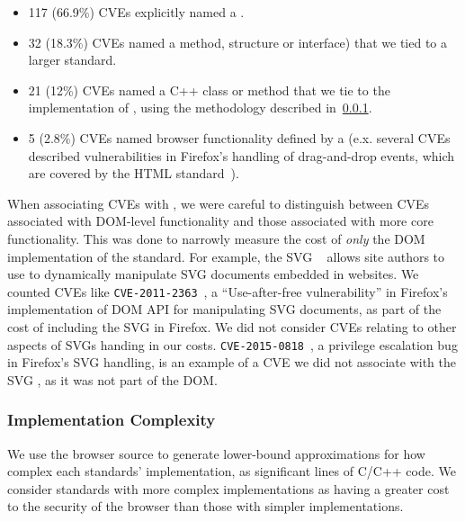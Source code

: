 \hspace{1em}
\begin{itemize}

  \item 117 (66.9\%) CVEs explicitly named a \WAS.
  \item 32 (18.3\%) CVEs named a \JS method, structure
        or interface) that we tied to a larger standard.
  \item 21 (12\%) CVEs named a C++ class or method that we
        tie to the implementation of \WAS, using the methodology described
        in~\ref{cost-benefit:methodology:costs-loc}.
  \item 5 (2.8\%) CVEs named browser functionality defined by a \WAS
        (e.x. several CVEs described vulnerabilities in Firefox's handling of
        drag-and-drop events, which are covered by the HTML
        standard~\cite{whatwg2018html}).
\end{itemize}
\hspace{1em}

When associating CVEs with \WASs, we were careful to distinguish
between CVEs associated with DOM-level functionality and those associated with
more core functionality.  This was done to narrowly measure the cost of
\textit{only} the DOM implementation of the standard.  For example, the
SVG \WAS~\cite{svg2011standard} allows site authors to use \JS
to dynamically manipulate SVG documents embedded in websites.  We counted
CVEs like \texttt{CVE-2011-2363}~\cite{cve_2011_2363}, a ``Use-after-free vulnerability''
in Firefox's implementation of \JS DOM API for manipulating SVG documents,
as part of the cost of including the SVG \WAS in Firefox.  We did not consider
CVEs relating to other aspects of SVGs handing in our \WAS costs.
\texttt{CVE-2015-0818}~\cite{cve_2015_0818}, a privilege escalation
bug in Firefox's SVG handling, is an example of a CVE we did not associate with
the SVG \WAS, as it was not part of the DOM.


\subsubsection{Implementation Complexity}
\label{cost-benefit:methodology:costs-loc}

We use the browser source to generate lower-bound approximations
for how complex each standards' implementation, as significant lines of C/C++
code.  We consider standards with more complex implementations as having a
greater cost to the security of the browser than those with simpler implementations.

